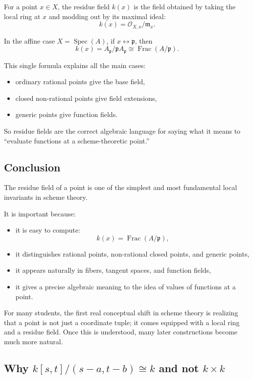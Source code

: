 \documentclass[12pt,a4paper]{article}
\theoremstyle{notespace}
\newcommand{\Spec}{\operatorname{Spec}}
\newcommand{\Frac}{\operatorname{Frac}}
\newcommand{\OO}{\mathcal O}
\newcommand{\m}{\mathfrak m}
\newcommand{\p}{\mathfrak p}
\theoremstyle{definition}
\begin{document}
For a point \(x\in X\), the residue field \(k(x)\) is the field obtained by taking the local ring at \(x\) and modding out by its maximal ideal:
\[
k(x)=\OO_{X,x}/\m_x.
\]

In the affine case \(X=\Spec(A)\), if \(x\leftrightarrow \p\), then
\[
k(x)=A_{\p}/\p A_{\p}\cong \Frac(A/\p).
\]

This single formula explains all the main cases:

\begin{itemize}[leftmargin=2em]
	\item ordinary rational points give the base field,
	\item closed non-rational points give field extensions,
	\item generic points give function fields.
\end{itemize}

So residue fields are the correct algebraic language for saying what it means to ``evaluate functions at a scheme-theoretic point.''

\subsection{Conclusion}

The residue field of a point is one of the simplest and most fundamental local invariants in scheme theory.

It is important because:

\begin{itemize}[leftmargin=2em]
	\item it is easy to compute:
	\[
	k(x)=\Frac(A/\p),
	\]
	\item it distinguishes rational points, non-rational closed points, and generic points,
	\item it appears naturally in fibers, tangent spaces, and function fields,
	\item it gives a precise algebraic meaning to the idea of values of functions at a point.
\end{itemize}

For many students, the first real conceptual shift in scheme theory is realizing that a point is not just a coordinate tuple; it comes equipped with a local ring and a residue field.  
Once this is understood, many later constructions become much more natural.


\subsection{Why \(k[s,t]/(s-a,t-b)\cong k\) and not \(k\times k\)}
\end{document}
